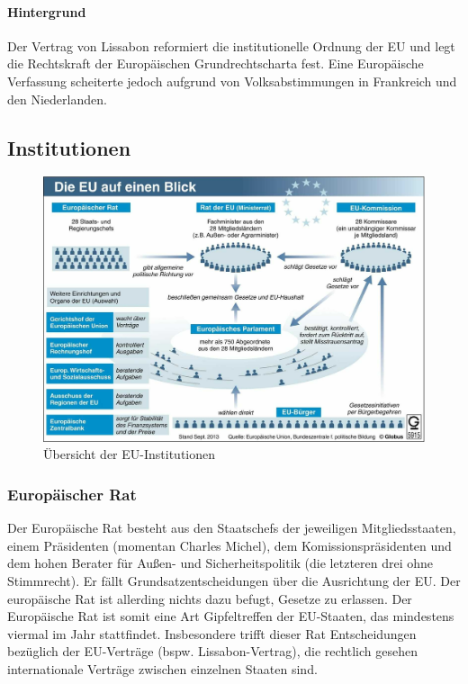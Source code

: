 \documentclass{article}
\begin{document}
	\paragraph{Hintergrund}
	Der Vertrag von Lissabon reformiert die institutionelle Ordnung der EU und legt die Rechtskraft der Europäischen Grundrechtscharta fest. Eine Europäische Verfassung scheiterte jedoch aufgrund von Volksabstimmungen in Frankreich und den Niederlanden.

	\subsection{Institutionen}

	\begin{figure}[!ht]
		\centering
  		\includegraphics[width=45em]{eu_institutionen.jpg}
  		\caption{Übersicht der EU-Institutionen}
  		\label{fig:eu_institutionen}
	\end{figure}
	
	\subsubsection{Europäischer Rat}
	Der Europäische Rat besteht aus den Staatschefs der jeweiligen Mitgliedsstaaten, einem Präsidenten (momentan Charles Michel), dem Komissionspräsidenten und dem hohen Berater für Außen- und Sicherheitspolitik (die letzteren drei ohne Stimmrecht). Er fällt Grundsatzentscheidungen über die Ausrichtung der EU. Der europäische Rat ist allerding nichts dazu befugt, Gesetze zu erlassen. Der Europäische Rat ist somit eine Art Gipfeltreffen der EU-Staaten, das mindestens viermal im Jahr stattfindet. Insbesondere trifft dieser Rat Entscheidungen bezüglich der EU-Verträge (bspw. Lissabon-Vertrag), die rechtlich gesehen internationale Verträge zwischen einzelnen Staaten sind.
\end{document}
